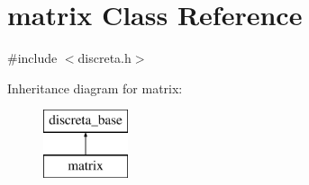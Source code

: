 \hypertarget{classmatrix}{}\section{matrix Class Reference}
\label{classmatrix}


{\ttfamily \#include $<$discreta.\+h$>$}

Inheritance diagram for matrix\+:\begin{figure}[H]
\begin{center}
\leavevmode
\includegraphics[height=2.000000cm]{classmatrix}
\end{center}
\end{figure}
